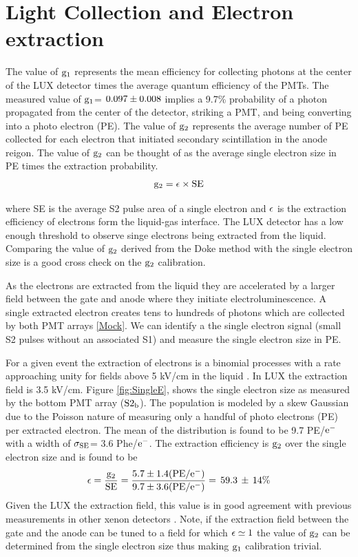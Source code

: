 \section{Light Collection and Electron extraction}

The value of $\rm g_1$ represents the mean efficiency for collecting photons at the center of the LUX detector times the average quantum efficiency of the PMTs. The measured value of $\rm g_1$= $\rm0.097\pm0.008$ implies a 9.7\% probability of a photon propagated from the center of the detector, striking a PMT, and being converting into a photo electron (PE). The value of $\rm g_2$ represents the average number of PE collected for each electron that initiated secondary scintillation in the anode reigon. The value of $\rm g_2$ can be thought of as the average single electron size in PE times the extraction probability.
\begin{equation}
\rm g_2=\epsilon \times SE
\end{equation}
 
 \noindent where SE is the average S2 pulse area of a single electron and $\rm \epsilon$ is the extraction efficiency of electrons form the liquid-gas interface. The LUX detector has a low enough threshold to observe singe electrons being extracted from the liquid. Comparing the value of $\rm g_2$ derived from the Doke method with the single electron size is a good cross check on the $\rm g_2$ calibration.
 
 As the electrons are extracted from the liquid they are accelerated by a larger field between the gate and anode where they initiate electroluminescence. A single extracted electron creates tens to hundreds of photons which are collected by both PMT arrays \ref{Mock}. We can identify a the single electron signal (small S2 pulses without an associated S1) and measure the single electron size in PE. 
 
 For a given event the extraction of electrons is a binomial processes with a rate approaching unity for fields above 5 kV/cm in the liquid \cite{Recomb_Time_Extraction} \cite{Aprile_LXe_overview}. In LUX the extraction field is 3.5 kV/cm. Figure \ref{fig:SingleE}, shows the single electron size as measured by the bottom PMT array ($\rm S2_b$). The population is modeled by a skew Gaussian due to the Poisson nature of measuring only a handful of photo electrons (PE) per extracted electron. The mean of the distribution is found to be 9.7 PE/$\rm e^-$ with a width of $\rm \sigma_{SE}$= 3.6 Phe/$\rm e^-$. The extraction efficiency is $\rm g_2$ over the single electron size and is found to be
\begin{equation}
\rm \epsilon =  \frac{g_2}{SE} = \frac{5.7 \pm 1.4 (PE/e^-)}{9.7 \pm 3.6 (PE/e^-)} = \, 59.3\, \pm \,14 \% 
\end{equation}
\noindent Given the LUX the extraction field, this value is in good agreement with previous measurements in other xenon detectors \cite{Recomb_Time_Extraction} \cite{Aprile_LXe_overview}. Note, if the extraction field between the gate and the anode can be tuned to a field for which $\rm \epsilon \simeq 1$ the value of $\rm g_2$ can be determined from the single electron size thus making $\rm g_1$ calibration trivial.

